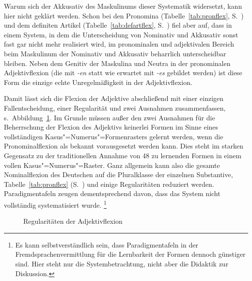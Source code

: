 Warum sich der Akkusativ des Maskulinums dieser Systematik widersetzt, kann hier nicht geklärt werden.
Schon bei den Pronomina (Tabelle~\ref{tab:pronflex}, S.~\pageref{tab:pronflex}) und dem definiten Artikel (Tabelle~\ref{tab:defartflex}, S.~\pageref{tab:defartflex}) fiel aber auf, dass in einem System, in dem die Unterscheidung von Nominativ und Akkusativ sonst fast gar nicht mehr realisiert wird, im pronominalen und adjektivalen Bereich beim Maskulinum der Nominativ und Akkusativ beharrlich unterscheidbar bleiben.
Neben dem Genitiv der Maskulina und Neutra in der pronominalen Adjektivflexion (die mit \textit{-en} statt wie erwartet mit \textit{-es} gebildet werden) ist diese Form die einzige echte Unregelmäßigkeit in der Adjektivflexion.

Damit lässt sich die Flexion der Adjektive abschließend mit einer einzigen Fallentscheidung, einer Regularität und zwei Ausnahmen zusammenfassen, s.\ Abbildung~\ref{fig:adjregeln}.
Im Grunde müssen außer den zwei Ausnahmen für die Beherrschung der Flexion des Adjektivs keinerlei Formen im Sinne eines vollständigen Kasus"=Numerus"=Formenrasters gelernt werden, wenn die Pronominalflexion als bekannt vorausgesetzt werden kann.
Dies steht im starken Gegensatz zu der traditionellen Annahme von 48 zu lernenden Formen in einem vollen Kasus"=Numerus"=Raster.
Ganz allgemein kann also die gesamte Nominalflexion des Deutschen auf die Pluralklasse der einzelnen Substantive, Tabelle~\ref{tab:pronflex} (S.~\pageref{tab:pronflex}) und einige Regularitäten reduziert werden.
Paradigmentafeln zeugen dementsprechend davon, dass das System nicht vollständig systematisiert wurde.%
\footnote{Es kann selbstverständlich sein, dass Paradigmentafeln \zB in der Fremdsprachenvermittlung für die Lernbarkeit der Formen dennoch günstiger sind.
Hier steht nur die Systembetrachtung, nicht aber die Didaktik zur Diskussion.}

\begin{figure}[!htbp]
  \centering
  \caption{Regularitäten der Adjektivflexion}
  \label{fig:adjregeln}
\end{figure}


